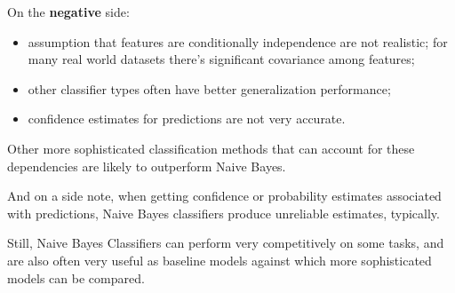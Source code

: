 \begin{multicols}{2}
On the \textbf{negative} side:
\begin{itemize}
\item assumption that features are conditionally independence are not realistic; for many real world datasets there's significant covariance among features;
\item other classifier types often have better generalization performance;
\item confidence estimates for predictions are not very accurate.
\end{itemize}

Other more sophisticated classification methods that can account for these dependencies are likely to outperform Naive Bayes. 

And on a side note, when getting confidence or probability estimates associated with predictions, Naive Bayes classifiers produce unreliable estimates, typically. 

Still, Naive Bayes Classifiers can perform very competitively on some tasks, and are also often very useful as baseline models against which more sophisticated models can be compared. 

\end{multicols}